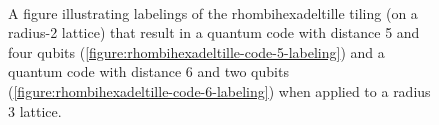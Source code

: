 \documentclass[twocolumn,showpacs,preprintnumbers,amsmath,amssymb,nofootinbib,pra,floatfix]{revtex4-1}
\begin{document}
\begin{figure}
\\
\caption{
\label{figure:rhombihexadeltille-code-56-labelings}
A figure illustrating labelings of the rhombihexadeltille tiling (on a radius-2 lattice) that result in a quantum code with distance 5 and four qubits (\ref{figure:rhombihexadeltille-code-5-labeling}) and a quantum code with distance 6 and two qubits (\ref{figure:rhombihexadeltille-code-6-labeling}) when applied to a radius 3 lattice.
}
\end{figure}
\end{document}
